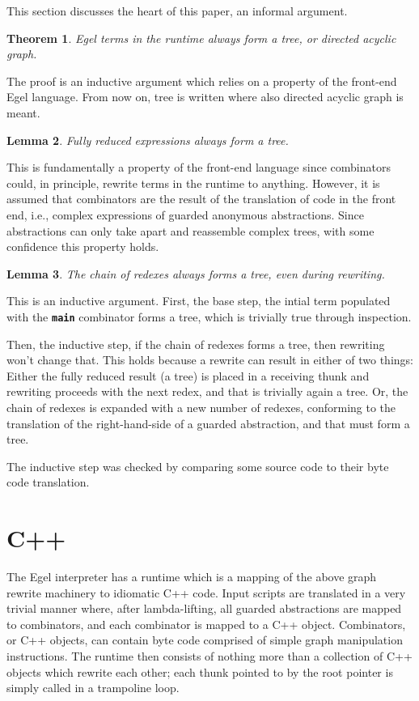 \documentclass{research4cacm}
\newcommand{\code}[1]{{\bf\texttt{#1}}}
\newtheorem{theorem}{Theorem}[section]
\newtheorem{lemma}[theorem]{Lemma}
\begin{document}
This section discusses the heart of this paper, an informal
argument.

\begin{theorem}
Egel terms in the runtime always form a tree, or directed
acyclic graph.
\end{theorem}

The proof is an inductive argument which relies on a
property of the front-end Egel language. From now on,
tree is written where also directed acyclic graph is meant.

\begin{lemma}
Fully reduced expressions always form a tree.
\end{lemma}

This is fundamentally a property of the front-end
language since combinators could, in principle, rewrite
terms in the runtime to anything. However, it is assumed
that combinators are the result of the translation of 
code in the front end, i.e., complex expressions of 
guarded anonymous abstractions. Since abstractions can
only take apart and reassemble complex trees, with
some confidence this property holds. 

\begin{lemma}
The chain of redexes always forms a tree, even during rewriting.
\end{lemma}

This is an inductive argument. First, the base step, the intial term
populated with the \code{main} combinator forms a tree, 
which is trivially true through inspection.

Then, the inductive step, if the chain of redexes forms a tree,
then rewriting won't change that. This holds because a rewrite
can result in either of two things: Either the fully
reduced result (a tree) is placed in a receiving thunk and
rewriting proceeds with the next redex, and that is trivially
again a tree. Or, the chain of redexes is expanded with a new number 
of redexes, conforming to the translation of the right-hand-side of
a guarded abstraction, and that must form a tree.

The inductive step was checked by comparing some source code to
their byte code translation.

\section{C++}

The Egel interpreter has a runtime which is a mapping of the above
graph rewrite machinery to idiomatic C++ code. Input
scripts are translated in a very trivial manner where,
after lambda-lifting, all guarded abstractions are mapped
to combinators, and each combinator is mapped to a C++
object. Combinators, or C++ objects, can contain byte
code comprised of simple graph manipulation instructions.
The runtime then consists of nothing more than a
collection of C++ objects which rewrite each other;
each thunk pointed to by the root pointer is 
simply called in a trampoline loop.
\end{document}
